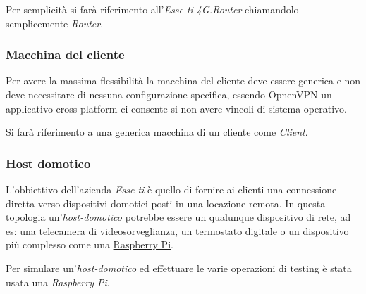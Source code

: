 Per semplicità si farà riferimento all'\textit{Esse-ti 4G.Router} chiamandolo semplicemente \textit{Router}.

\subsubsection{Macchina del cliente}
\label{subsec:macchina-cliente}

Per avere la massima flessibilità la macchina del cliente deve essere generica e non deve necessitare di nessuna configurazione specifica, essendo OpnenVPN un applicativo cross-platform ci consente si non avere vincoli di sistema operativo.

Si farà riferimento a una generica macchina di un cliente come \textit{Client}.

\newpage
\subsubsection{Host domotico}

L'obbiettivo dell'azienda \textit{Esse-ti} è quello di fornire ai clienti una connessione diretta verso dispositivi domotici posti in una locazione remota. In questa topologia un'\textit{host-domotico} potrebbe essere un qualunque dispositivo di rete, ad es: una telecamera di videosorveglianza, un termostato digitale o un dispositivo più complesso come una \href{https://en.wikipedia.org/wiki/Raspberry_Pi}{Raspberry Pi}.

Per simulare un'\textit{host-domotico} ed effettuare le varie operazioni di testing è stata usata una \textit{Raspberry Pi}.


